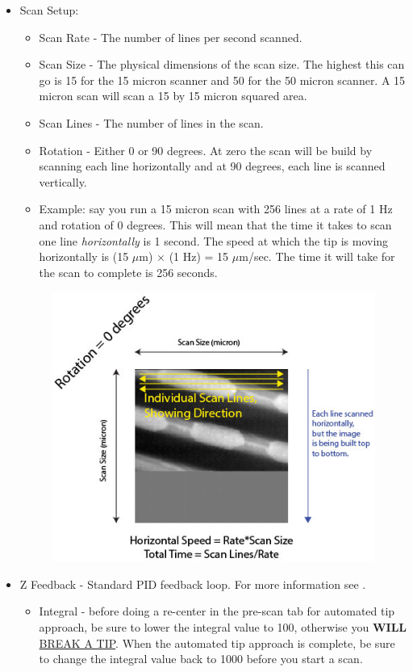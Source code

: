 \documentclass{../lab}
\begin{document}
\begin{itemize}
    \item Scan Setup:

    \begin{itemize}
        \item Scan Rate - The number of lines per second scanned.

        \item Scan Size - The physical dimensions of the scan size. The highest this can go is 15 for the 15 micron scanner and 50 for the 50 micron scanner. A 15 micron scan will scan a 15 by 15 micron squared area.

        \item Scan Lines - The number of lines in the scan.

        \item Rotation - Either 0 or 90 degrees. At zero the scan will be build by scanning each line horizontally and at 90 degrees, each line is scanned vertically.

        \item Example: say you run a 15 micron scan with 256 lines at a rate of 1 Hz and rotation of 0 degrees. This will mean that the time it takes to scan one line \emph{horizontally} is 1 second. The speed at which the tip is moving horizontally is (15 $\mu$m) $\times$ (1 Hz) = 15 $\mu$m/sec.  The time it will take for the scan to complete is 256 seconds.

    \end{itemize}

    \begin{figure}[h]
        \centering
        \includegraphics[width=0.5\linewidth]{images/scanningmethod.jpg}
    \end{figure}

    \item Z Feedback - Standard PID feedback loop. For more information see .

    \begin{itemize}
        \item Integral - before doing a re-center in the pre-scan tab for automated tip approach, be sure to lower the integral value to 100, otherwise you \textbf{WILL} \hyperref[subsec:BrokenTip]{BREAK A TIP}. When the automated tip approach is complete, be sure to change the integral value back to 1000 before you start a scan.


\end{itemize}
\end{itemize}
\end{document}
